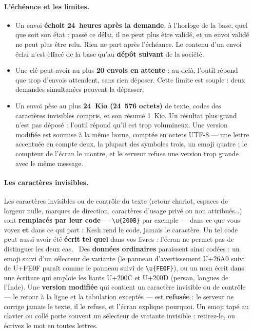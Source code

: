 \documentclass[a4paper,11pt,oneside]{article}
\begin{document}
\paragraph{L'échéance et les limites.}
\begin{itemize}
    \item Un envoi \textbf{échoit 24~heures après la demande}, à l'horloge de la base, quel que soit son état : passé ce délai, il ne peut plus être validé, et un envoi validé ne peut plus être relu. Rien ne part après l'échéance. Le contenu d'un envoi échu n'est effacé de la base qu'au \textbf{dépôt suivant} de la société.
    \item Une clé peut avoir au plus \textbf{20 envois en attente} ; au-delà, l'outil répond que trop d'envois attendent, sans rien déposer. Cette limite est souple : deux demandes simultanées peuvent la dépasser.
    \item Un envoi pèse au plus \textbf{24~Kio (24~576 octets)} de texte, codes des caractères invisibles compris, et son résumé 1~Kio. Un résultat plus grand n'est pas déposé : l'outil répond qu'il est trop volumineux. Une version modifiée est soumise à la même borne, comptée en octets UTF-8 --- une lettre accentuée en compte deux, la plupart des symboles trois, un emoji quatre ; le compteur de l'écran le montre, et le serveur refuse une version trop grande avec le même message.
\end{itemize}

\paragraph{Les caractères invisibles.} Les caractères invisibles ou de contrôle du texte (retour chariot, espaces de largeur nulle, marques de direction, caractères d'usage privé ou non attribués\ldots) sont \textbf{remplacés par leur code} --- \texttt{\textbackslash{}u\{200B\}} par exemple --- dans ce que vous voyez \textbf{et} dans ce qui part : Kesh rend le code, jamais le caractère. Un tel code peut aussi avoir été \textbf{écrit tel quel} dans vos livres : l'écran ne permet pas de distinguer les deux cas. \keshAttention\ Des \textbf{données ordinaires} paraissent ainsi codées : un emoji suivi d'un sélecteur de variante (le panneau d'avertissement U+26A0 suivi de U+FE0F paraît comme le panneau suivi de \texttt{\textbackslash{}u\{FE0F\}}), ou un nom écrit dans une écriture qui emploie les liants U+200C et U+200D (persan, langues de l'Inde). Une \textbf{version modifiée} qui contient un caractère invisible ou de contrôle --- le retour à la ligne et la tabulation exceptés --- est \textbf{refusée} : le serveur ne corrige jamais le texte, il le refuse, et l'écran explique pourquoi. Un emoji tapé au clavier ou collé porte souvent un sélecteur de variante invisible : retirez-le, ou écrivez le mot en toutes lettres.
\end{document}
